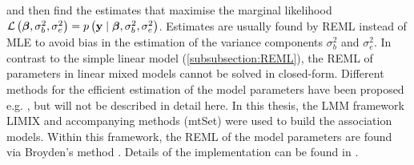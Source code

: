 %
and then find the estimates that maximise the marginal likelihood \(\mathcal{L}\left(\boldsymbol{\mathbf{\beta}}, \sigma_b^2, \sigma_e^2\right) = p\left(\boldsymbol{\mathbf{y}}\mid \boldsymbol{\mathbf{\beta}},\sigma_b^2, \sigma_e^2\right)\). 
Estimates are usually found by REML instead of MLE to avoid bias in the estimation of the variance components \(\sigma_b^2\) and \( \sigma_e^2\). In contrast to the simple linear model (\cref{subsubsection:REML}), the REML of parameters in linear mixed models cannot be solved in closed-form. Different methods for the efficient estimation of the model parameters have been proposed e.g. \citep{Lippert2011}, but will not be described in detail here. In this thesis, the LMM framework LIMIX and accompanying methods (mtSet) were used to build the association models. Within this framework, the REML of the model parameters are found via Broyden's method \citep{Broyden1965}. Details of the implementation can be found in \citep[Supplementary material]{Casale2015}.

